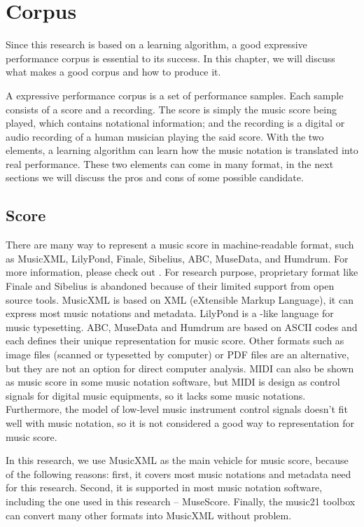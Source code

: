 \chapter{Corpus}
Since this research is based on a learning algorithm, a good expressive performance corpus is essential to its success. In this chapter, we will discuss what makes a good corpus and how to produce it. 

A expressive performance corpus is a set of performance samples. Each sample consists of a score and a recording. The score is simply the music score being played, which contains notational information; and the recording is a digital or audio recording of a human musician playing the said score. With the two elements, a learning algorithm can learn how the music notation is translated into real performance. These two elements can come in many format, in the next sections we will discuss the pros and cons of some possible candidate.

\section{Score}
There are many way to represent a music score in machine-readable format, such as MusicXML\cite{TODO:musicxml}, LilyPond\cite{TODO:lilypond}, Finale, Sibelius, ABC, MuseData, and Humdrum. For more information, please check out \cite{TODO: Beyond MIDI: THe Handbook of Musical Codes}. For research purpose, proprietary format like Finale and Sibelius is abandoned because of their limited support from open source tools. MusicXML is based on XML (eXtensible Markup Language), it can express most music notations and metadata. LilyPond is a \LaTex-like language for music typesetting. ABC, MuseData and Humdrum are based on ASCII codes and each defines their unique representation for music score. 
Other formats such as image files (scanned or typesetted by computer) or PDF files are an alternative, but they are not an option for direct computer analysis. MIDI can also be shown as music score in some music notation software, but MIDI is design as control signals for digital music equipments, so it lacks some music notations. Furthermore, the model of low-level music instrument control signals doesn't fit well with music notation, so it is not considered a good way to representation for music score.

In this research, we use MusicXML as the main vehicle for music score, because of the following reasons: first, it covers most music notations and metadata need for this research. Second, it is supported in most music notation software, including the one used in this research -- MuseScore. Finally, the music21 toolbox can convert many other formats into MusicXML without problem.


